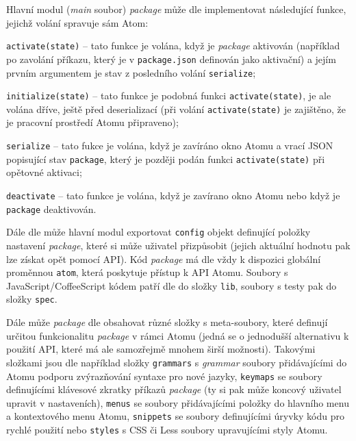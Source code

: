 Hlavní modul (\textit{main} soubor) \textit{package} může dle \cite{atom-docs} implementovat následující funkce, jejichž
volání spravuje sám Atom:
\begin{itemize}
    \begin{sloppypar}
    \item \texttt{activate(state)} – tato funkce je volána, když je \textit{package} aktivován (například po
        zavolání příkazu, který je v \texttt{package.json} definován jako aktivační) a jejím prvním argumentem
        je stav z posledního volání \texttt{serialize};
    \end{sloppypar}
    \item \texttt{initialize(state)} – tato funkce je podobná funkci \texttt{activate(state)}, je ale
        volána dříve, ještě před deserializací (při volání \texttt{activate(state)} je zajištěno, že je
        pracovní prostředí Atomu připraveno);
    \begin{sloppypar}
    \item \texttt{serialize} – tato fukce je volána, když je zavíráno okno Atomu a vrací JSON popisující stav
        \texttt{package}, který je později podán funkci \texttt{activate(state)} při opětovné
        aktivaci;
    \end{sloppypar}
    \item \texttt{deactivate} – tato funkce je volána, když je zavírano okno Atomu nebo když je
        \texttt{package} deaktivován.
\end{itemize}
Dále dle \cite{atom-docs} může hlavní modul exportovat \texttt{config} objekt definující položky nastavení
\textit{package}, které si může uživatel přizpůsobit (jejich aktuální hodnotu pak lze získat opět pomocí API). Kód
\textit{package} má dle \cite{atom-docs} vždy k dispozici globální proměnnou \texttt{atom}, která poskytuje
přístup k API Atomu. Soubory s JavaScript/CoffeeScript kódem patří dle \cite{atom-docs} do složky \texttt
{lib}, soubory s testy pak do složky \texttt{spec}.

Dále může \textit{package} dle \cite{atom-docs} obsahovat různé složky s meta-soubory, které definují určitou
funkcionalitu \textit{package} v rámci Atomu (jedná se o jednodušší alternativu k použití API, které má ale samozřejmě
mnohem širší možnosti). Takovými složkami jsou dle \cite{atom-docs} například složky \texttt{grammars} s
\textit{grammar} soubory přidávajícími do Atomu podporu zvýrazňování syntaxe pro nové jazyky, \texttt{keymaps}
se soubory definujícími klávesové zkratky příkazů \textit{package} (ty si pak může koncový uživatel upravit v
nastaveních), \texttt{menus} se soubory přidávajícími položky do hlavního menu a kontextového menu Atomu,
\texttt{snippets} se soubory definujícími úryvky kódu pro rychlé použití nebo \texttt{styles} s CSS
či Less soubory upravujícími styly Atomu.

